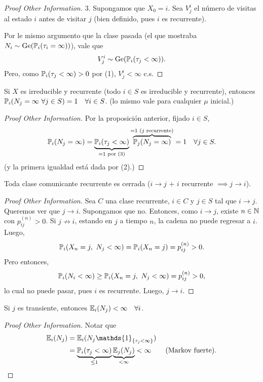 
\begin{proof}[Proof Other Information]
	$\boxed{3.}$ Supongamos que $X_{0} = i$. Sea $V_{j}^{i}$ el número de visitas al estado $i$ antes de visitar $j$ (bien definido, pues $i$ es recurrente). \par
	Por le mismo argumento que la clase pasada (el que mostraba $N_{i} \sim \operatorname{Ge}(\mathbb{P}_{i}(\tau_{i} = \infty))$), vale que
	\[ V_{j}^{i} \sim \operatorname{Ge}(\mathbb{P}_{i}(\tau_{j} < \infty)). \]
	Pero, como $\mathbb{P}_{i}(\tau_{j} < \infty) > 0$ por (1), $V_{j}^{i} < \infty$ c.s.
\end{proof}

\begin{corollary}
	Si $X$ es irreducible y recurrente (todo $i \in S$ es irreducible y recurrente), entonces $\mathbb{P}_{i}(N_{j} = \infty \ \forall j \in S) = 1 \quad \forall i \in S$. (lo mismo vale para cualquier $\mu$ inicial.)
\end{corollary}
\begin{proof}[Proof Other Information]
	Por la proposición anterior, fijado $i \in S$,
	\[ \mathbb{P}_{i}(N_{j} = \infty) = \underbrace{\mathbb{P}_{i}(\tau_{j} < \infty)}_{=1 \text{ por (3)}} \overbrace{\mathbb{P}_{j}(N_{j} = \infty)}^{= 1 \text{ ($j$ recurrente)}} = 1 \quad \forall  j \in S. \]
	(y la primera igualdad está dada por (2).)
\end{proof}

\begin{prop}
	Toda clase comunicante recurrente es cerrada ($i \to j$ + $i$ recurrente $\implies j \to i$).
\end{prop}
\begin{proof}[Proof Other Information]
	Sea $C$ una clase recurrente, $i \in C$ y $j \in S$ tal que $i \to j$. Queremos ver que $j \to i$. Supongamos que no. Entonces, como $i \to j$, existe $n \in \mathbb{N}$ con $p_{ij}^{(n)} > 0$. Si $j \not\to i$, estando en $j$ a tiempo $n$, la cadena no puede regresar a $i$. Luego, 
	\[ \mathbb{P}_{i}(X_{n} = j,\ N_{j} < \infty) = \mathbb{P}_{i}(X_{n} = j) = p_{ij}^{(n)} > 0. \]
	Pero entonces, 
	\[ \mathbb{P}_{i}(N_{i} < \infty) \geq \mathbb{P}_{i}(X_{n} = j,\ N_{j} < \infty) = p_{ij}^{(n)} > 0, \]
	lo cual no puede pasar, pues $i$ es recurrente. Luego, $j \to i$.
\end{proof}

\begin{prop}
	Si $j$ es transiente, entonces $\mathbb{E}_{i}(N_{j}) < \infty \quad \forall i$.
\end{prop}
\begin{proof}[Proof Other Information]
	Notar que
	\begin{align*}
		\mbb{E}_{i}(N_{j}) &= \mbb{E}_{i}(N_{j} \mathds{1}_{\{\tau_{j} < \infty\}}) \\
		&= \underbrace{\mbb{P}_{i}(\tau_{j} < \infty)}_{\leq 1} \underbrace{\mbb{E}_{j}(N_{j})}_{< \infty} < \infty \tag{Markov fuerte}
	.\end{align*}
\end{proof}

